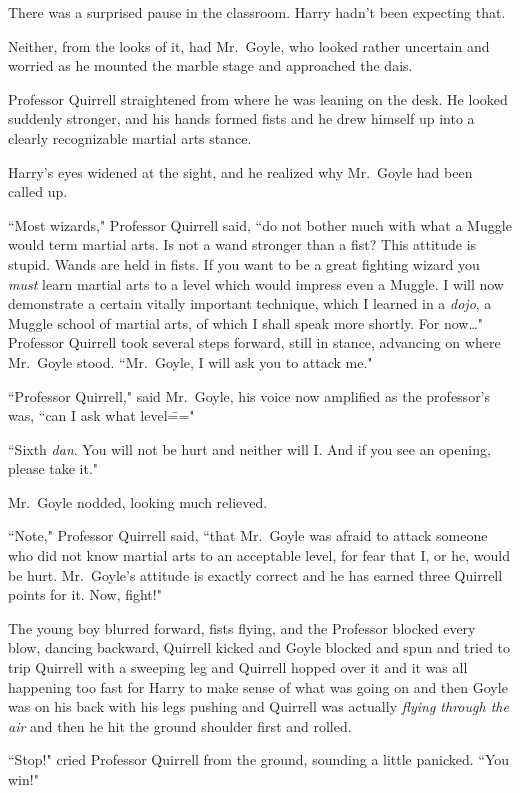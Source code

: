 There was a surprised pause in the classroom. Harry hadn't been expecting that.

Neither, from the looks of it, had Mr.~Goyle, who looked rather uncertain and worried as he mounted the marble stage and approached the dais.

Professor Quirrell straightened from where he was leaning on the desk. He looked suddenly stronger, and his hands formed fists and he drew himself up into a clearly recognizable martial arts stance.

Harry's eyes widened at the sight, and he realized why Mr.~Goyle had been called up.

``Most wizards," Professor Quirrell said, ``do not bother much with what a Muggle would term martial arts. Is not a wand stronger than a fist? This attitude is stupid. Wands are held in fists. If you want to be a great fighting wizard you \emph{must} learn martial arts to a level which would impress even a Muggle. I will now demonstrate a certain vitally important technique, which I learned in a \emph{dojo}, a Muggle school of martial arts, of which I shall speak more shortly. For now{\ldots}" Professor Quirrell took several steps forward, still in stance, advancing on where Mr.~Goyle stood. ``Mr.~Goyle, I will ask you to attack me."

``Professor Quirrell," said Mr.~Goyle, his voice now amplified as the professor's was, ``can I ask what level\==="

``Sixth \emph{dan}. You will not be hurt and neither will I\@. And if you see an opening, please take it."

Mr.~Goyle nodded, looking much relieved.

``Note," Professor Quirrell said, ``that Mr.~Goyle was afraid to attack someone who did not know martial arts to an acceptable level, for fear that I, or he, would be hurt. Mr.~Goyle's attitude is exactly correct and he has earned three Quirrell points for it. Now, fight!"

The young boy blurred forward, fists flying, and the Professor blocked every blow, dancing backward, Quirrell kicked and Goyle blocked and spun and tried to trip Quirrell with a sweeping leg and Quirrell hopped over it and it was all happening too fast for Harry to make sense of what was going on and then Goyle was on his back with his legs pushing and Quirrell was actually \emph{flying through the air} and then he hit the ground shoulder first and rolled.

``Stop!" cried Professor Quirrell from the ground, sounding a little panicked. ``You win!"

